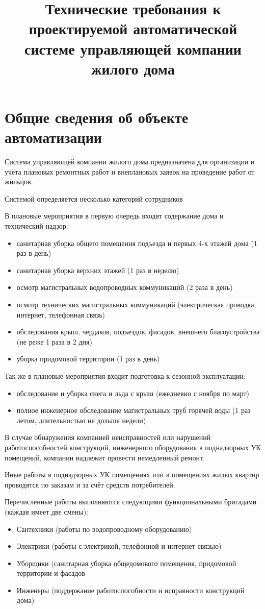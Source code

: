 \title{Технические требования к проектируемой автоматической системе управляющей компании жилого дома}



\section{Общие сведения об объекте автоматизации}

Система управляющей компании жилого дома предназначена для организации и учёта плановых ремонтных работ и внеплановых заявок на проведение работ от жильцов.

Системой определяется несколько категорий сотрудников

В плановые мероприятия в первую очередь входят содержание дома и технический надзор:
\begin{itemize}
\item санитарная уборка общего помещения подъезда и первых 4-х этажей дома (1 раз в день)
\item санитарная уборка верхних этажей (1 раз в неделю)
\item осмотр магистральных водопроводных коммуникаций (2 раза в день)
\item осмотр технических магистральных коммуникаций (электрическая проводка, интернет, телефонная связь)
\item обследования крыш, чердаков, подъездов, фасадов, внешнего благоустройства (не реже 1 раза в 2 дня)
\item уборка придомовой территории (1 раз в день)
\end{itemize}

Так же в плановые мероприятия входит подготовка к сезонной эксплуатации:

\begin{itemize}
\item обследование и уборка снега и льда с крыш (ежедневно с ноября по март)
\item полное инженерное обследование магистральных труб горячей воды (1 раз летом, длительностью не дольше недели)
\end{itemize}
В случае обнаружения компанией неисправностей или нарушений работоспособностей конструкций, инженерного оборудования в поднадзорных УК помещений, компании надлежит провести немедленный ремонт.

Иные работы в поднадзорных УК помещениях или в помещениях жилых квартир проводятся по заказам и за счёт средств потребителей. 

Перечисленные работы выполняются следующими функциональными бригадами (каждая имеет две смены):
\begin{itemize}
\item Сантехники (работы по водопроводному оборудованию)
\item Электрики (работы с электрикой, телефонной и интернет связью)
\item Уборщики (санитарная уборка общедомового помещения, придомовой территории и фасадов
\item Инженеры (поддержание работоспособности и исправности конструкций дома)
\end{itemize}

